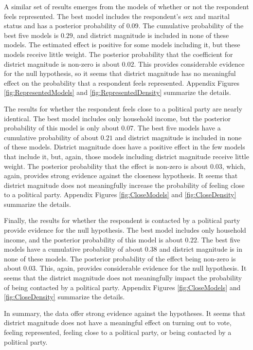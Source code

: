 \documentclass[12pt]{article}
\begin{document}
A similar set of results emerges from the models of whether or not the respondent feels represented. The best model includes the respondent's sex and marital status and has a posterior probability of $0.09$. The cumulative probability of the best five models is $0.29$, and district magnitude is included in none of these models. The estimated effect is positive for some models including it, but these models receive little weight. The posterior probability that the coefficient for district magnitude is non-zero is about $0.02$. This provides considerable evidence for the null hypothesis, so it seems that district magnitude has no meaningful effect on the probability that a respondent feels represented. Appendix Figures \ref{fig:RepresentedModels} and \ref{fig:RepresentedDensity} summarize the details. 

The results for whether the respondent feels close to a political party are nearly identical. The best model includes only household income, but the posterior probability of this model is only about $0.07$. The best five models have a cumulative probability of about $0.21$ and district magnitude is included in none of these models. District magnitude does have a positive effect in the few models that include it, but, again, those models including district magnitude receive little weight. The posterior probability that the effect is non-zero is about $0.03$, which, again, provides strong evidence against the closeness hypothesis. It seems that district magnitude does not meaningfully increase the probability of feeling close to a political party. Appendix Figures \ref{fig:CloseModels} and \ref{fig:CloseDensity} summarize the details. 

Finally, the results for whether the respondent is contacted by a political party provide evidence for the null hypothesis. The best model includes only household income, and the posterior probability of this model is about $0.22$. The best five models have a cumulative probability of about $0.38$ and district magnitude is in none of these models. The posterior probability of the effect being non-zero is about $0.03$. This, again, provides considerable evidence for the null hypothesis. It seems that the district magnitude does not meaningfully impact the probability of being contacted by a political party. Appendix Figures \ref{fig:CloseModels} and \ref{fig:CloseDensity} summarize the details. 

In summary, the data offer strong evidence against the hypotheses. It seems that district magnitude does not have a meaningful effect on turning out to vote, feeling represented, feeling close to a political party, or being contacted by a political party.
\end{document}
